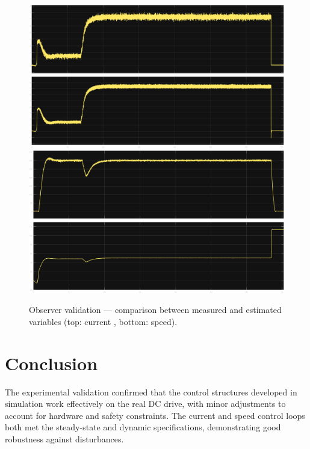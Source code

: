 \documentclass{rapportCS}
\begin{document}
\begin{figure}[H]
    \centering
    \includegraphics[width=\linewidth, keepaspectratio]{figures/p3i.png}
    \vspace{0.5em}
    \includegraphics[width=\linewidth, keepaspectratio]{figures/pw.png}
    \caption{Observer validation --- comparison between measured and estimated variables (top: current , bottom: speed).}
    \label{fig:exp_obs_results}
\end{figure}


\newpage

\section{Conclusion}
The experimental validation confirmed that the control structures developed in simulation work effectively on the real DC drive, with minor adjustments to account for hardware and safety constraints. 
The current and speed control loops both met the steady-state and dynamic specifications, demonstrating good robustness against disturbances.
\end{document}
